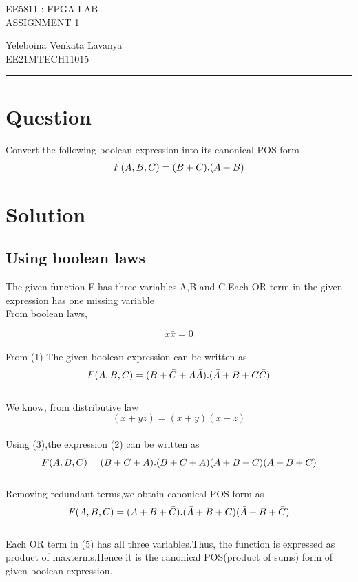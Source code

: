 \documentclass[10pt,a4paper]{article}
\begin{document}
\begin{center}

{\huge EE5811 : FPGA LAB}\\
{\large ASSIGNMENT 1}

\end{center}
\begin{center}
    
Yeleboina Venkata Lavanya 
\\EE21MTECH11015
\end{center}

\vspace{15pt}
\hrule
\vspace{5pt}
\section*{Question}
Convert the following boolean expression into its canonical POS form
\begin{equation*}
    F(A,B,C)=(B+\Bar{C}).(\Bar{A}+B)
\end{equation*}




\section{Solution}
\subsection{Using boolean laws}
The given function F has three variables A,B and C.Each OR term in the given expression has one missing variable
\\From boolean laws,

\begin{equation}
x\bar{x}=0
\end{equation}
\\From (1) The given boolean expression can be written as
\begin{equation}
    F(A,B,C)=(B+\Bar{C}+A\bar{A}).(\Bar{A}+B+C\bar{C})
\end{equation}
\\We know, from distributive law
\begin{equation}
(x+yz)=(x+y)(x+z)
\end{equation}
\\Using (3),the expression (2) can be written as
\begin{equation}
    F(A,B,C)=(B+\Bar{C}+A).(B+\Bar{C}+\bar{A})(\Bar{A}+B+C)(\Bar{A}+B+\bar{C})
\end{equation}
\\Removing redundant terms,we obtain canonical POS form as
\begin{equation}
    F(A,B,C)=(A+B+\Bar{C}).(\Bar{A}+B+C)(\Bar{A}+B+\bar{C})
\end{equation}
\\Each OR term in (5) has all three variables.Thus, the function is expressed as product of maxterms.Hence it is the canonical POS(product of sums) form of given boolean expression.
\end{document}
